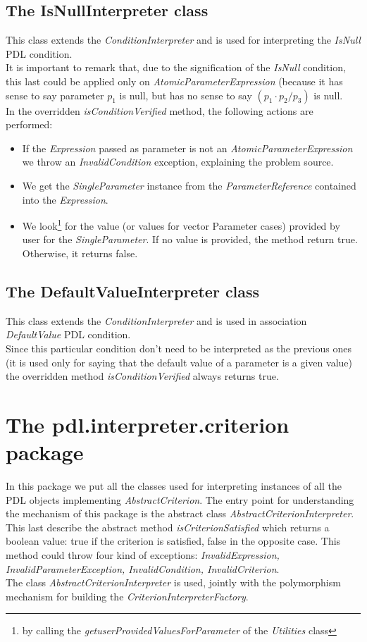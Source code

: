 \documentclass[a4paper,11pt] {ivoa}
\begin{document}
\subsection{The IsNullInterpreter class}
This class  extends the  {\it ConditionInterpreter} and is used for interpreting the {\it IsNull} PDL condition. \\
It is important to remark that, due to the signification of the {\it IsNull} condition, this last could be applied only on {\it AtomicParameterExpression} (because it has sense to say parameter $p_1$ is null, but has no sense to say $(p_1 \cdot p_2 / p_3)$ is null.\\
In the overridden {\it isConditionVerified} method, the following actions are performed:
\begin{itemize}
\item If the {\it Expression} passed as parameter is not an {\it AtomicParameterExpression} we throw an {\it InvalidCondition} exception, explaining the problem source.
\item We get the {\it SingleParameter} instance from the {\it ParameterReference} contained into the {\it Expression}.
\item We look\footnote{by calling the {\it getuserProvidedValuesForParameter} of the {\it Utilities} class} for the value (or values for vector Parameter cases) provided by user for the {\it SingleParameter}. If no value is provided, the method return true. Otherwise, it returns false.
\end{itemize}

\subsection{The DefaultValueInterpreter class}
This class extends the {\it ConditionInterpreter} and is used in association {\it DefaultValue} PDL condition. \\
Since this particular condition don't need to be interpreted as the previous ones (it is used only for saying that the default value of a parameter is a given value) the overridden method  {\it isConditionVerified}  always returns true.

\section{The pdl.interpreter.criterion package}
In this package we put all the classes used for interpreting instances of all the PDL objects implementing {\it AbstractCriterion}.
The entry point for understanding the mechanism of this package is the abstract class {\it AbstractCriterionInterpreter}.
This last describe the abstract method {\it isCriterionSatisfied} which returns a boolean value: true if the criterion is satisfied, false in the opposite case. This method could throw four kind of exceptions: {\it InvalidExpression, InvalidParameterException, InvalidCondition, InvalidCriterion}.\\
The class  {\it AbstractCriterionInterpreter} is used, jointly with the polymorphism mechanism for building the {\it CriterionInterpreterFactory}.
\end{document}
